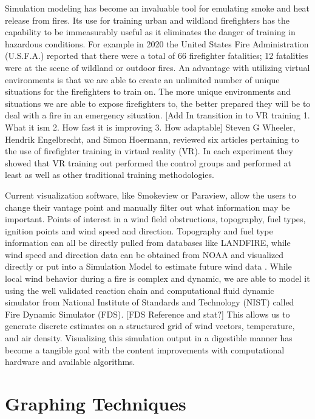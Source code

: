 Simulation modeling has become an invaluable tool for emulating smoke and heat release from fires. Its use for training urban and wildland firefighters has the capability to be immeasurably useful as it eliminates the danger of training in hazardous conditions. For example in 2020 the United States Fire Administration (U.S.F.A.) reported that there were a total of 66 firefighter fatalities; 12 fatalities were at the scene of wildland or outdoor fires. \cite{FireFatalities} An advantage with utilizing virtual environments is that we are able to create an unlimited number of unique situations for the firefighters to train on. The more unique environments and situations we are able to expose firefighters to, the better prepared they will be to deal with a fire in an emergency situation. 
[Add In transition in to VR training 1. What it ism 2. How fast it is improving 3. How adaptable]
Steven G Wheeler, Hendrik Engelbrecht, and Simon Hoermann, reviewed six articles pertaining to the use of firefighter training in virtual reality (VR).\cite{Wheeler2021}  In each experiment they showed that VR training out performed the control groups and performed at least as well as other traditional training methodologies. 
\par
Current visualization software, like Smokeview or Paraview, allow the users to change their vantage point and manually filter out what information may be important. Points of interest in a wind field  obstructions, topography, fuel types, ignition points and wind speed and direction. Topography and fuel type information can all be directly pulled from databases like LANDFIRE, while wind speed and direction data can be obtained from NOAA and visualized directly or put into a Simulation Model to estimate future wind data \cite{WindNN}. While local wind behavior during a fire is complex and dynamic, we are able to model it using the well validated reaction chain and computational fluid dynamic simulator from National Institute of Standards and Technology (NIST) called Fire Dynamic Simulator (FDS). \color{red}[FDS Reference and stat?]\color{black} This allows us to generate discrete estimates on a structured grid of wind vectors, temperature, and air density. Visualizing this simulation output in a digestible manner has become a tangible goal with the content improvements with computational hardware and available algorithms.   




\section{Graphing Techniques}

